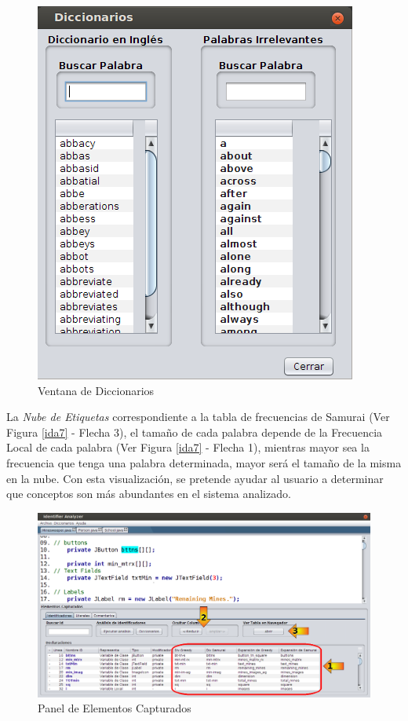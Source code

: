 \begin{figure}[t] %
\centerline{%
\includegraphics[scale= 0.58]{./cap4/ida_09.png}
}
\caption{Ventana de Diccionarios}
\label{ida9}
\end{figure}

La \textit{Nube de Etiquetas} correspondiente a la tabla de frecuencias de Samurai (Ver Figura \ref{ida7} - Flecha 3), el tamaño de cada palabra depende de la Frecuencia Local de cada palabra (Ver Figura \ref{ida7} - Flecha 1), mientras mayor sea la frecuencia que tenga una palabra determinada, mayor será el tamaño de la misma en la nube. Con esta visualización, se pretende ayudar al usuario a determinar que conceptos son más abundantes en el sistema analizado.


\pagebreak

\begin{figure}[t] %
\centerline{%
\includegraphics[scale= 0.42]{./cap4/ida_10.png}
}
\caption{Panel de Elementos Capturados}
\label{ida10}
\end{figure}

